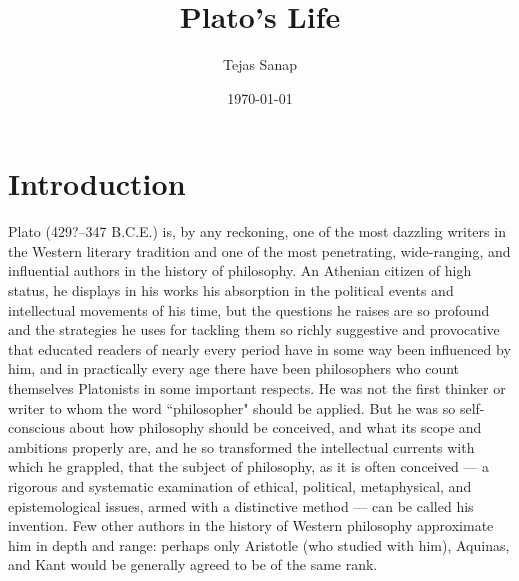 \documentclass[11pt]{article}
\title{Plato's Life}
\author{Tejas Sanap}
\date{\today}
\begin{document}
	\maketitle

	\section{Introduction}

		Plato (429?–347 B.C.E.) is, by any reckoning, one of the most dazzling writers in the Western literary tradition and one of the most penetrating, wide-ranging, and influential authors in the history of philosophy. An Athenian citizen of high status, he displays in his works his absorption in the political events and intellectual movements of his time, but the questions he raises are so profound and the strategies he uses for tackling them so richly suggestive and provocative that educated readers of nearly every period have in some way been influenced by him, and in practically every age there have been philosophers who count themselves Platonists in some important respects. He was not the first thinker or writer to whom the word ``philosopher" should be applied. But he was so self-conscious about how philosophy should be conceived, and what its scope and ambitions properly are, and he so transformed the intellectual currents with which he grappled, that the subject of philosophy, as it is often conceived --- a rigorous and systematic examination of ethical, political, metaphysical, and epistemological issues, armed with a distinctive method --- can be called his invention. Few other authors in the history of Western philosophy approximate him in depth and range: perhaps only Aristotle (who studied with him), Aquinas, and Kant would be generally agreed to be of the same rank.
\end{document}
